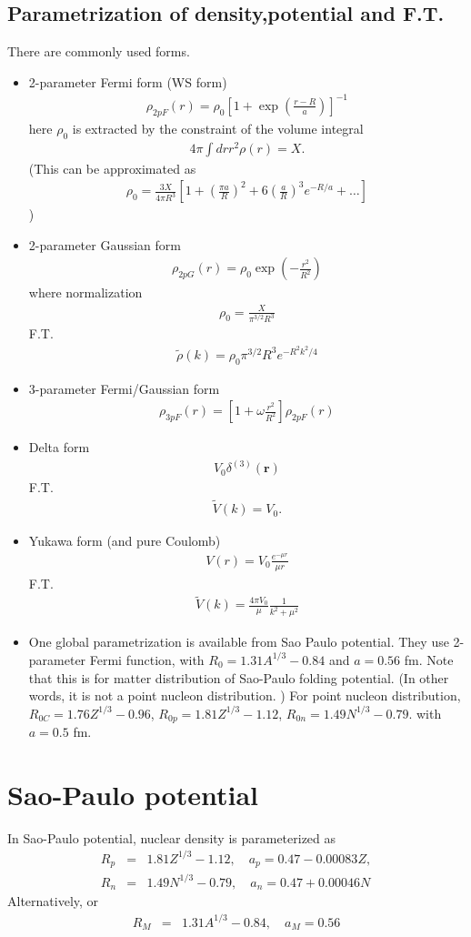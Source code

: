 \documentclass[11pt]{book}
\def\bm{\boldsymbol}
\def\vr{{\bm r}}
\newcommand{\bea}{\begin{eqnarray}}
\newcommand{\eea}{\end{eqnarray}}
\newcommand{\no}{\nonumber \\}
\begin{document}
\subsection{Parametrization of density,potential and F.T.}
There are commonly used forms.
\begin{itemize}
	\item 2-parameter Fermi form (WS form)
	\bea 
	\rho_{2pF}(r)=\rho_0\left[1+\exp\left(\frac{r-R}{a}\right)\right]^{-1}
	\eea 
	here $\rho_0$ is extracted by the constraint of the volume integral 
     \bea 
     4\pi\int dr r^2 \rho(r) =X.
     \eea 
     (This can be approximated as
     \bea 
     \rho_0 = \frac{3 X}{4\pi R^3}\left[1+(\frac{\pi a}{R})^2+6(\frac{a}{R})^3 e^{-R/a}+\dots\right] 
     \eea 
     )
     
	\item 2-parameter Gaussian form
	\bea 
	\rho_{2pG}(r)=\rho_0 \exp\left(-\frac{r^2}{R^2}\right) 
	\eea 
	where normalization 
	\bea 
	\rho_0 = \frac{X}{\pi^{3/2} R^3}
	\eea 
	F.T.
	\bea 
	\tilde{\rho}(k) = \rho_0 \pi^{3/2} R^3 e^{-R^2 k^2/4}
	\eea 
	
	\item 3-parameter Fermi/Gaussian form
	\bea 
	\rho_{3pF}(r)=\left[1+\omega \frac{r^2}{R^2}\right]\rho_{2pF}(r)  
	\eea 
	
	\item Delta form 
	\bea 
	V_0 \delta^{(3)}(\vr)
	\eea 
	F.T. 
	\bea 
	\tilde{V}(k) = V_0.
	\eea 
	
	\item Yukawa form (and pure Coulomb)
	\bea 
	V(r)=V_0\frac{e^{-\mu r}}{\mu r}
	\eea 
	F.T. 
	\bea 
	\tilde{V}(k)= \frac{4\pi V_0}{\mu}\frac{1}{k^2+\mu^2}
	\eea 
	\item 
	One global parametrization is available from Sao Paulo potential. 
	They use 2-parameter Fermi function, with $R_0=1.31 A^{1/3}-0.84$ and $a=0.56$ fm. 
	Note that this is for matter distribution of Sao-Paulo folding potential. 
	(In other words, it is not a point nucleon distribution. ) 
	For point nucleon distribution, $R_{0C}=1.76 Z^{1/3}-0.96$, $R_{0p}=1.81 Z^{1/3}-1.12$, $R_{0n}=1.49 N^{1/3}-0.79$. 
	with $a=0.5$ fm. 
	
\end{itemize}


\section{Sao-Paulo potential}
In Sao-Paulo potential, nuclear density is parameterized as
\bea 
R_p &=& 1.81 Z^{1/3}-1.12,\quad a_p = 0.47-0.00083 Z,\no 
R_n &=& 1.49 N^{1/3}-0.79,\quad a_n = 0.47+0.00046 N
\eea  
Alternatively, 
or 
\bea 
R_{M} &=& 1.31 A^{1/3}-0.84,\quad a_M = 0.56 
\eea  
 
\end{document}
